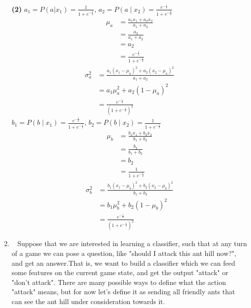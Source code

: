 \documentclass[10pt]{article}
\begin{document}
\begin{enumerate}
	\item[\textbf{(2)}]
 		$a_1=P(a|x_1)=\frac{1}{1+e^{-\frac{1}{2}}}$,
		$a_2=P\left(a \mid x_{2}\right)=\frac{e^{-\frac{1}{2}}}{1+e^{-\frac{1}{2}}}$
		$$
		\begin{aligned}
		\mu_a&=\frac{a_1x_1 + a_2x_2}{a_1 + a_2}
		\\&=\frac{a_2}{a_1 + a_2}
		\\&=a_2
		\\&=\frac{e^{-\frac{1}{2}}}{1+e^{-\frac{1}{2}}}
		\end{aligned}
		$$
		$$
		\begin{aligned}
		\sigma_a^2 &= \frac{a_1(x_1-\mu_a)^2 + a_2(x_2-\mu_a)^2}{a_1 + a_2}
		\\&=a_1\mu_a^2 + a_2(1-\mu_a)^2
		\\&=\frac{e^{-\frac{1}{2}}}{(1+e^{-\frac{1}{2}})^2}
		\end{aligned}
		$$
		$b_1=P\left(b \mid x_{1}\right)=\frac{e^{-\frac{1}{2}}}{1+e^{-\frac{1}{2}}}$,
		$b_2=P\left(b \mid x_{2}\right)=\frac{1}{1+e^{-\frac{1}{2}}}$
		$$
		\begin{aligned}
		\mu_b&=\frac{b_1x_1 + b_2x_2}{b_1 + b_2}
		\\&=\frac{b_2}{b_1 + b_2}
		\\&=b_2
		\\&=\frac{1}{1+e^{-\frac{1}{2}}}
		\end{aligned}
		$$
		$$
		\begin{aligned}
		\sigma_b^2 &= \frac{b_1(x_1-\mu_b)^2 + b_2(x_2-\mu_b)^2}{b_1 + b_2}
		\\&=b_1\mu_b^2 + b_2(1-\mu_b)^2
		\\&=\frac{e^{-\frac{1}{2}}}{(1+e^{-\frac{1}{2}})^2}
		\end{aligned}
		$$
		 \newpage

	\item ~
	      Suppose that we are interested in learning a classifier, such that at any turn of a game we can pose a question, like "should I attack this ant hill now?", and get an answer.That is, we want to build a classifier which we can feed some features on the current game state, and get the output "attack" or "don't attack". There are many possible ways to define what the action "attack" means, but for now let's define it as sending all friendly ants that can see the ant hill under consideration towards it.


\end{enumerate}
\end{document}
